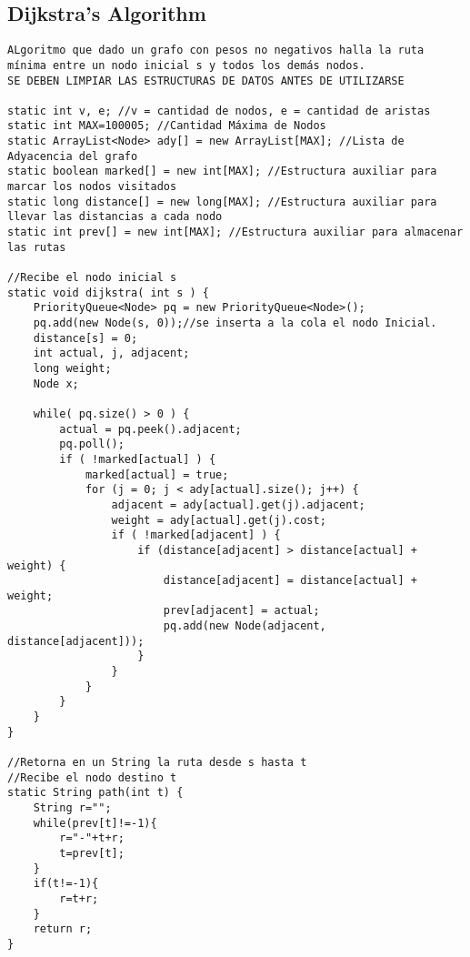 \documentclass[10pt,letterpaper,twocolumn,twosided]{article}
\begin{document}
\subsection{Dijkstra's Algorithm}
\begin{lstlisting}
ALgoritmo que dado un grafo con pesos no negativos halla la ruta mínima entre un nodo inicial s y todos los demás nodos.
SE DEBEN LIMPIAR LAS ESTRUCTURAS DE DATOS ANTES DE UTILIZARSE

static int v, e; //v = cantidad de nodos, e = cantidad de aristas
static int MAX=100005; //Cantidad Máxima de Nodos
static ArrayList<Node> ady[] = new ArrayList[MAX]; //Lista de Adyacencia del grafo
static boolean marked[] = new int[MAX]; //Estructura auxiliar para marcar los nodos visitados
static long distance[] = new long[MAX]; //Estructura auxiliar para llevar las distancias a cada nodo
static int prev[] = new int[MAX]; //Estructura auxiliar para almacenar las rutas
    
//Recibe el nodo inicial s
static void dijkstra( int s ) {
    PriorityQueue<Node> pq = new PriorityQueue<Node>();
    pq.add(new Node(s, 0));//se inserta a la cola el nodo Inicial.
    distance[s] = 0;
    int actual, j, adjacent;
    long weight;
    Node x;

    while( pq.size() > 0 ) {
        actual = pq.peek().adjacent;
        pq.poll();
        if ( !marked[actual] ) {
            marked[actual] = true;
            for (j = 0; j < ady[actual].size(); j++) {
                adjacent = ady[actual].get(j).adjacent;
                weight = ady[actual].get(j).cost;
                if ( !marked[adjacent] ) {
                    if (distance[adjacent] > distance[actual] + weight) {
                        distance[adjacent] = distance[actual] + weight;
                        prev[adjacent] = actual;
                        pq.add(new Node(adjacent, distance[adjacent]));
                    }
                }
            }
        }
    }
}

//Retorna en un String la ruta desde s hasta t
//Recibe el nodo destino t
static String path(int t) {
    String r="";
    while(prev[t]!=-1){
        r="-"+t+r;
        t=prev[t];
    }
    if(t!=-1){
        r=t+r;
    }
    return r;
}   

\end{lstlisting}
\end{document}
